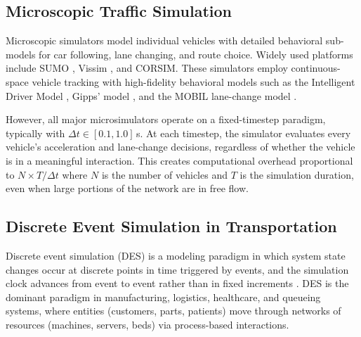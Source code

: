 \documentclass[review,authoryear]{elsarticle}
\begin{document}
\subsection{Microscopic Traffic Simulation}
\label{sec:lit_microsim}

Microscopic simulators model individual vehicles with detailed behavioral sub-models for car following, lane changing, and route choice. Widely used platforms include SUMO \citep{lopez2018microscopic}, Vissim \citep{fellendorf2010microscopic}, and CORSIM. These simulators employ continuous-space vehicle tracking with high-fidelity behavioral models such as the Intelligent Driver Model \citep[IDM;][]{treiber2000congested}, Gipps' model \citep{gipps1981behavioural}, and the MOBIL lane-change model \citep{kesting2007general}.

However, all major microsimulators operate on a fixed-timestep paradigm, typically with $\Delta t \in [0.1, 1.0]$\,s. At each timestep, the simulator evaluates every vehicle's acceleration and lane-change decisions, regardless of whether the vehicle is in a meaningful interaction. This creates computational overhead proportional to $N \times T / \Delta t$ where $N$ is the number of vehicles and $T$ is the simulation duration, even when large portions of the network are in free flow.

\subsection{Discrete Event Simulation in Transportation}
\label{sec:lit_des}

Discrete event simulation (DES) is a modeling paradigm in which system state changes occur at discrete points in time triggered by events, and the simulation clock advances from event to event rather than in fixed increments \citep{banks2010discrete}. DES is the dominant paradigm in manufacturing, logistics, healthcare, and queueing systems, where entities (customers, parts, patients) move through networks of resources (machines, servers, beds) via process-based interactions.
\end{document}
